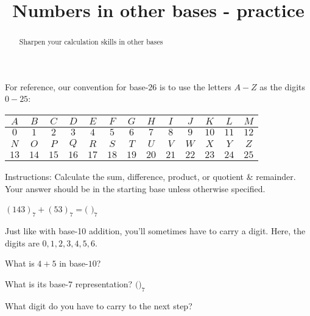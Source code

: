 \documentclass[handout,numbers]{ximera}
\title{Numbers in other bases - practice}
\begin{document}
\begin{abstract} {Sharpen your calculation skills in other bases}
\end{abstract}
\maketitle

For reference, our convention for base-$26$ is to use the letters $A-Z$ as the digits $0-25$:

\begin{center}
\begin{small}
\begin{tabular}{|c|c|c|c|c|c|c|c|c|c|c|c|c|}
\hline
 $A$ & $B$ & $C$ & $D$ & $E$ & $F$ & $G$ & $H$ & $I$ & $J$ & $K$ & $L$ & $M$  \\
 \hline
$0$ & $1$ & $2$ & $3$ & $4$ & $5$ & $6$ & $7$ & $8$ & $9$ & $10$ & $11$ & $12$ \\
\hline
\hline
$N$ & $O$ & $P$ & $Q$ & $R$ & $S$ & $T$ & $U$ & $V$ & $W$ & $X$ & $Y$ & $Z$\\
\hline
$13$ & $14$ & $15$ & $16$ & $17$ & $18$ & $19$ & $20$ & $21$ & $22$ & $23$ & $24$ & $25$ \\
\hline
\end{tabular}
\end{small}
\end{center}

Instructions: Calculate the sum, difference, product, or quotient \& remainder.  Your answer should be in the starting base unless otherwise specified.

\begin{question}
$(143)_7 + (53)_7 = ($ \qquad\qquad {}$)_7$

\begin{hint} Just like with base-10 addition, you'll sometimes have to carry a digit.  Here, the digits are $0, 1, 2, 3, 4, 5, 6$.

\begin{prompt} What is $4+5$ in base-$10$? \qquad\qquad {}\end{prompt}

\begin{prompt} What is its base-$7$ representation? $($\qquad\qquad {}$)_7$\end{prompt}

\begin{prompt} What digit do you have to carry to the next step? 
\end{prompt}
\end{hint}


\end{question}
\end{document}
